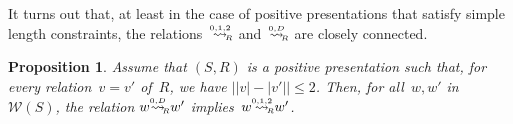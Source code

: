 \documentclass{amsart}
\numberwithin{equation}{section}
\theoremstyle{plain}
\newtheorem{prop}{Proposition}[section]
\theoremstyle{definition}
\let\le=\leqslant
\begin{document}
It turns out that, at least in the case of positive presentations that satisfy simple length constraints, the relations~${\mathrel{{\mathrel{\overset{\scriptscriptstyle 0,1,2}{\rightsquigarrow}}}_{\hspace{-0.9ex}{\scriptscriptstyle R}}}}$ and~${\mathrel{{\mathrel{\overset{\scriptscriptstyle 0,D}{\rightsquigarrow}}}_{\hspace{-0.6ex}{\scriptscriptstyle R}}}}$ are closely connected.

\begin{prop}
\label{P:Connection}
Assume that $({S}, {R})$ is a positive presentation such that, for every relation~${v} = {v}'$ of~${R}$, we have $\big\vert{\vert{v}\vert} - {\vert{{v}'}\vert}\big\vert \le 2$. Then, for all~${w}, {w}'$ in~${\mathcal{W}({S})}$, the relation ${w} {\mathrel{{\mathrel{\overset{\scriptscriptstyle 0,D}{\rightsquigarrow}}}_{\hspace{-0.6ex}{\scriptscriptstyle R}}}} {w}'$ implies~${w} {\mathrel{{\mathrel{\overset{\scriptscriptstyle 0,1,2}{\rightsquigarrow}}}_{\hspace{-0.9ex}{\scriptscriptstyle R}}}} {w}'$.
\end{prop}
\end{document}
